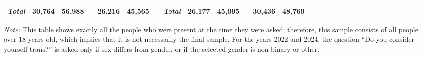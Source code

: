 \begin{table}[htpb]
{\begin{tabular}{lcclccl|rcclccl}
\textit{Total}                                    & 30,764 & 56,988 &  & 26,216 & 45,565 &  & \multicolumn{1}{l}{\textit{Total}} & 26,177 & 45,095 &  & 30,436 & 48,769 &  \\ \hline
\end{tabular}%
}
\vspace{1ex}
\raggedright
\footnotesize \textit{Note:} This table shows exactly all the people who were present at the time they were asked; therefore, this sample consists of all people over 18 years old, which implies that it is not necessarily the final sample. For the years 2022 and 2024, the question ``Do you consider yourself trans?'' is asked only if sex differs from gender, or if the selected gender is non-binary or other.
\end{table}
